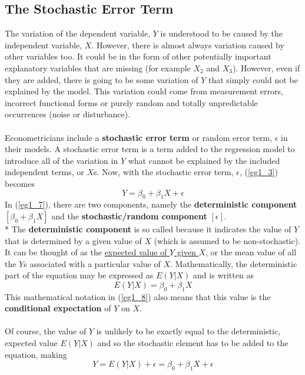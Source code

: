 \documentclass[11pt]{article}
\begin{document}
\subsection{The Stochastic Error Term}
The variation of the dependent variable, $Y$ is understood to be caused by the independent variable, $X$. However, there is almost always variation caused by other variables too. It could be in the form of other potentially important explanatory variables that are missing (for example $X_2$ and $X_3$). However, even if they are added, there is going to be some variation of $Y$ that simply could not be explained by the model. This variation could come from measurement errors, incorrect functional forms or purely random and totally unpredictable occurrences (noise or disturbance). \\ \\
Econometricians include a \textbf{stochastic error term} or random error term, $\epsilon$ in their models. A stochastic error term is a term added to the regression model to introduce all of the variation in $Y$ what cannot be explained by the included independent terms, or $X$s. Now, with the stochastic error term, $\epsilon$,  (\ref{eg1_3}) becomes
\begin{equation}
Y=\beta_0+\beta_1X + \epsilon \label{eg1_7}
\end{equation}
In (\ref{eg1_7}), there are two components, namely the \textbf{deterministic component} $[\beta_0+\beta_1X]$ and the \textbf{stochastic/random component} $[\epsilon]$.\\*
The \textbf{deterministic component} is so called because it indicates the value of $Y$ that is determined by a given value of $X$ (which is assumed to be non-stochastic). It can be thought of as the \underline{expected value of $Y$ given $X$}, or the mean value of all the $Y$s associated with a particular value of $X$. Mathematically, the deterministic part of the equation may be expressed as $E(Y|X)$ and is written as 
\begin{equation}
E(Y|X) = \beta_0 + \beta_1 X \label{eg1_8}
\end{equation}
This mathematical notation in (\ref{eg1_8}) also means that this value is the \textbf{conditional expectation} of $Y$ on $X$.\\ \\
Of course, the value of $Y$ is unlikely to be exactly equal to the deterministic, expected value $E(Y|X)$ and so the stochastic element has to be added to the equation, making
\begin{equation}
Y = E(Y|X) + \epsilon = \beta_0 + \beta_1 X + \epsilon \label{eg1_9}
\end{equation}
\end{document}
